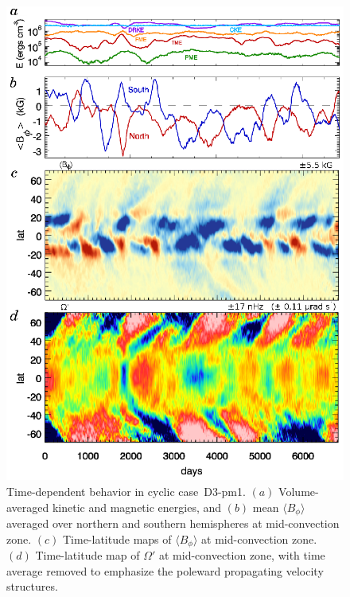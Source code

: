 \begin{figure}
  \begin{center}
    \includegraphics[width=0.8\linewidth]{figs/chapter_8/time_history_mmc_vturf_3_pm1.eps}
  \end{center}
    \caption[Time-dependent behavior in cyclic case~D3-pm1]
	  {Time-dependent behavior in cyclic case~D3-pm1.  $(a)$
	  Volume-averaged kinetic and magnetic energies, and 
	  $(b)$ mean $\langle B_\phi \rangle$ averaged over northern
	  and southern hemispheres at mid-convection zone.
	  $(c)$  Time-latitude maps of $\langle B_\phi \rangle$ at
	  mid-convection zone.    
	  $(d)$   Time-latitude map of $\Omega'$ at mid-convection zone,
	  with time average removed to emphasize the poleward
	  propagating velocity structures.
	  \label{fig:D3 pm1}}
\end{figure}


